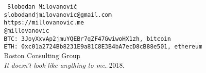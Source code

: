 \documentclass{UUThesisTemplate}
\begin{document}
\par
{\color{white}\texttt{
Slobodan Milovanović\\
slobodandjmilovanovic@gmail.com\\
https://millovanovic.me\\
@millovanovic\\
BTC: 3JoyXxvAp2jmuYQEBr7qZF47GwiwoHX1zh, bitcoin\\
ETH: 0xc01a2724Bb8231E9a81C8E3B4bA7ecD8cB88e501, ethereum\\}
Boston Consulting Group\\
\emph{It doesn't look like anything to me.}
2018.
}








\end{document}
